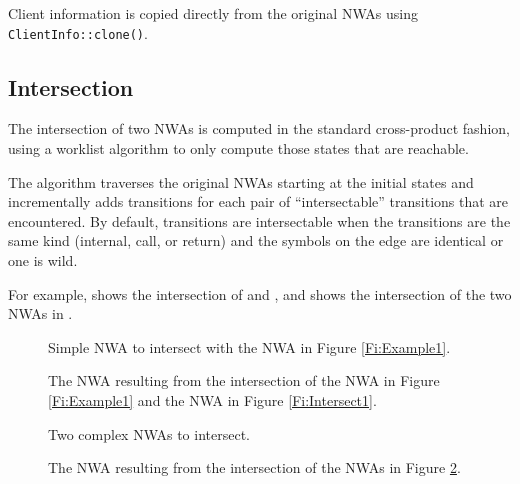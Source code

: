 Client information is copied directly from the original NWAs using
\texttt{ClientInfo::clone()}.


\subsection{Intersection}
\label{Se:Intersection}

The intersection of two NWAs is computed in the standard cross-product
fashion, using a worklist algorithm to only compute those states that
are reachable.

The algorithm traverses the original NWAs starting at
the initial states and incrementally adds transitions for each pair of
``intersectable'' transitions that are encountered. By default, transitions
are intersectable when the transitions are the same kind (internal, call,
or return) and the symbols on the edge are identical or one is wild.

For example,  shows the intersection of  and
, and  shows the intersection of the
two NWAs in .

 
\begin{figure}[tp]
  \centering
  \begin{minipage}{0.49\textwidth}
    \centering
    \caption{Simple NWA to intersect with the NWA in Figure \ref{Fi:Example1}.}
    \label{Fi:Intersect1}
  \end{minipage}
  \begin{minipage}{0.49\textwidth}
    \centering
    \caption{The NWA resulting from the intersection of the NWA in Figure
      \ref{Fi:Example1} and the NWA in Figure \ref{Fi:Intersect1}.}
    \label{Fi:Intersect2}
  \end{minipage}
\end{figure}

\begin{figure}[p]
  \centering
  \caption{Two complex NWAs to intersect.}
  \label{Fi:Intersect3}
\end{figure}

\begin{figure}[p]
  \centering
  \caption{The NWA resulting from the intersection of the NWAs in Figure \ref{Fi:Intersect3}.}
  \label{Fi:Intersect4}
\end{figure}

